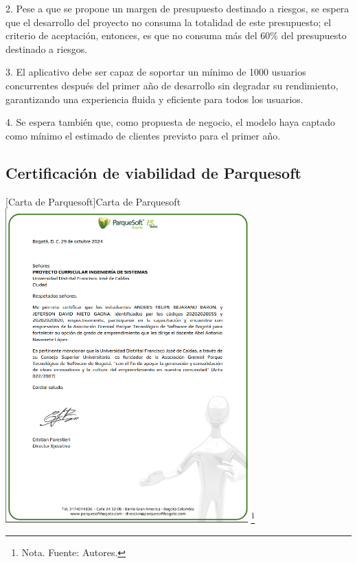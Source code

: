 2. Pese a que se propone un margen de presupuesto destinado a riesgos, se espera que el desarrollo del proyecto no consuma la totalidad de este presupuesto; el criterio de aceptación, entonces, es que no consuma más del 60\% del presupuesto destinado a riesgos.

3. El aplicativo debe ser capaz de soportar un mínimo de 1000 usuarios concurrentes después del primer año de desarrollo sin degradar su rendimiento, garantizando una experiencia fluida y eficiente para todos los usuarios.

4. Se espera también que, como propuesta de negocio, el modelo haya captado como mínimo el estimado de clientes previsto para el primer año.

\subsection{Certificación de viabilidad de Parquesoft}
\centering
{}[{Carta de Parquesoft}]{Carta de Parquesoft}
\includegraphics[width=0.7\textwidth]{Content/Images/CartaParquesoft.png}
\footnote{Nota. \textup{Fuente: Autores.}}
